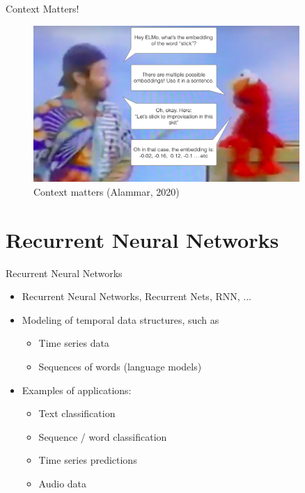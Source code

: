 \documentclass[10pt]{beamer}
\begin{document}
\begin{frame}{Context Matters!}

\begin{figure}[h]
\centering
\includegraphics[width=0.9\textwidth]{fig/elmo-embedding-robin-williams.png}
\caption{Context matters (Alammar, 2020)}
\end{figure}

\end{frame}


\section{Recurrent Neural Networks}
\frame{\sectionpage}

\begin{frame}{Recurrent Neural Networks}

\begin{itemize}
\item Recurrent Neural Networks, Recurrent Nets, RNN, ...
\item Modeling of {\color{uured} temporal data structures}, such as
\begin{itemize}
\item Time series data
\item Sequences of words (language models)
\end{itemize}
\pause
\item Examples of applications:
\begin{itemize}
\item Text classification
\item Sequence / word classification
\item Time series predictions
\item Audio data
\end{itemize}

\end{itemize}

\end{frame}
\end{document}
